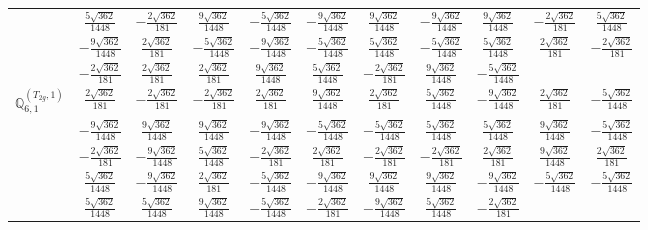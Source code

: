 \documentclass[fleqn,10pt,landscape]{article}
\begin{document}
\begin{itemize}
{\begin{center}
\begin{longtable}{ccccccccccc}
& $ \frac{5 \sqrt{362}}{1448} $ & $ - \frac{2 \sqrt{362}}{181} $ & $ \frac{9 \sqrt{362}}{1448} $ & $ - \frac{5 \sqrt{362}}{1448} $ & $ - \frac{9 \sqrt{362}}{1448} $ & $ \frac{9 \sqrt{362}}{1448} $ & $ - \frac{9 \sqrt{362}}{1448} $ & $ \frac{9 \sqrt{362}}{1448} $ & $ - \frac{2 \sqrt{362}}{181} $ & $ \frac{5 \sqrt{362}}{1448} $ \\
& $ - \frac{9 \sqrt{362}}{1448} $ & $ \frac{2 \sqrt{362}}{181} $ & $ - \frac{5 \sqrt{362}}{1448} $ & $ - \frac{9 \sqrt{362}}{1448} $ & $ - \frac{5 \sqrt{362}}{1448} $ & $ \frac{5 \sqrt{362}}{1448} $ & $ - \frac{5 \sqrt{362}}{1448} $ & $ \frac{5 \sqrt{362}}{1448} $ & $ \frac{2 \sqrt{362}}{181} $ & $ - \frac{2 \sqrt{362}}{181} $ \\
& $ - \frac{2 \sqrt{362}}{181} $ & $ \frac{2 \sqrt{362}}{181} $ & $ \frac{2 \sqrt{362}}{181} $ & $ \frac{9 \sqrt{362}}{1448} $ & $ \frac{5 \sqrt{362}}{1448} $ & $ - \frac{2 \sqrt{362}}{181} $ & $ \frac{9 \sqrt{362}}{1448} $ & $ - \frac{5 \sqrt{362}}{1448} $ & $  $ & $  $ \\ \hline
$\mathbb{Q}_{6,1}^{(T_{2g},1)}$ & $ \frac{2 \sqrt{362}}{181} $ & $ - \frac{2 \sqrt{362}}{181} $ & $ - \frac{2 \sqrt{362}}{181} $ & $ \frac{2 \sqrt{362}}{181} $ & $ \frac{9 \sqrt{362}}{1448} $ & $ \frac{2 \sqrt{362}}{181} $ & $ \frac{5 \sqrt{362}}{1448} $ & $ - \frac{9 \sqrt{362}}{1448} $ & $ \frac{2 \sqrt{362}}{181} $ & $ - \frac{5 \sqrt{362}}{1448} $ \\
& $ - \frac{9 \sqrt{362}}{1448} $ & $ \frac{9 \sqrt{362}}{1448} $ & $ \frac{9 \sqrt{362}}{1448} $ & $ - \frac{9 \sqrt{362}}{1448} $ & $ - \frac{5 \sqrt{362}}{1448} $ & $ - \frac{5 \sqrt{362}}{1448} $ & $ \frac{5 \sqrt{362}}{1448} $ & $ \frac{5 \sqrt{362}}{1448} $ & $ \frac{9 \sqrt{362}}{1448} $ & $ - \frac{5 \sqrt{362}}{1448} $ \\
& $ - \frac{2 \sqrt{362}}{181} $ & $ - \frac{9 \sqrt{362}}{1448} $ & $ \frac{5 \sqrt{362}}{1448} $ & $ - \frac{2 \sqrt{362}}{181} $ & $ \frac{2 \sqrt{362}}{181} $ & $ - \frac{2 \sqrt{362}}{181} $ & $ - \frac{2 \sqrt{362}}{181} $ & $ \frac{2 \sqrt{362}}{181} $ & $ \frac{9 \sqrt{362}}{1448} $ & $ \frac{2 \sqrt{362}}{181} $ \\
& $ \frac{5 \sqrt{362}}{1448} $ & $ - \frac{9 \sqrt{362}}{1448} $ & $ \frac{2 \sqrt{362}}{181} $ & $ - \frac{5 \sqrt{362}}{1448} $ & $ - \frac{9 \sqrt{362}}{1448} $ & $ \frac{9 \sqrt{362}}{1448} $ & $ \frac{9 \sqrt{362}}{1448} $ & $ - \frac{9 \sqrt{362}}{1448} $ & $ - \frac{5 \sqrt{362}}{1448} $ & $ - \frac{5 \sqrt{362}}{1448} $ \\
& $ \frac{5 \sqrt{362}}{1448} $ & $ \frac{5 \sqrt{362}}{1448} $ & $ \frac{9 \sqrt{362}}{1448} $ & $ - \frac{5 \sqrt{362}}{1448} $ & $ - \frac{2 \sqrt{362}}{181} $ & $ - \frac{9 \sqrt{362}}{1448} $ & $ \frac{5 \sqrt{362}}{1448} $ & $ - \frac{2 \sqrt{362}}{181} $ & $  $ & $  $ \\ \hline

\end{longtable}
\end{center}}
\end{itemize}
\end{document}
